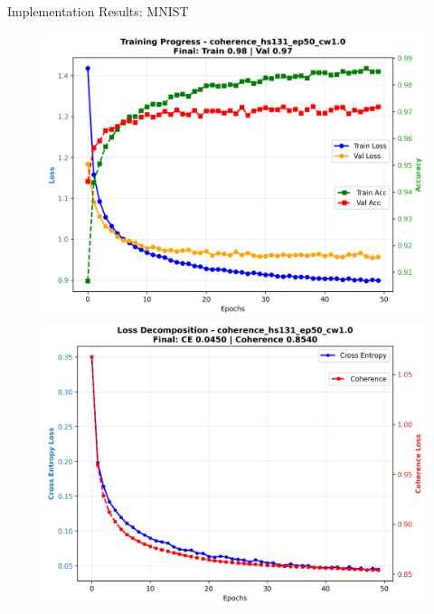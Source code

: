 \documentclass[9pt,dvipsnames]{beamer}
\begin{document}
\begin{frame}{Implementation Results: MNIST}
\begin{figure}[H]
\begin{minipage}[b]{0.48\textwidth}
            \includegraphics[width=\textwidth,height=0.48\textheight,keepaspectratio]{../plots/mlp/mnist/hs131_ep50/coherence_hs131_ep50_cw1.0_training_curves.png} \\
            \vspace{0.5em}
            \includegraphics[width=\textwidth,height=0.48\textheight,keepaspectratio]{../plots/mlp/mnist/hs131_ep50/coherence_hs131_ep50_cw1.0_loss_decomposition.png}
        \end{minipage}
    \end{figure}

\end{frame}
\end{document}
